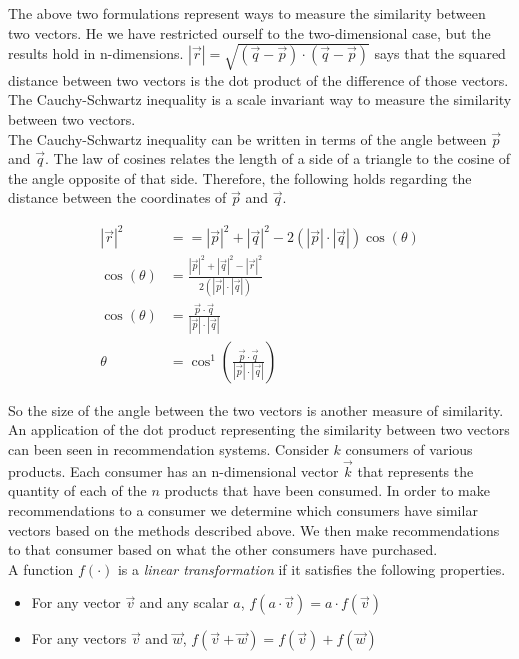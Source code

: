 \documentclass[12pt]{article}
\begin{document}
The above two formulations represent ways to measure the similarity between two vectors. He we have restricted ourself to the two-dimensional case, but the results hold in n-dimensions. $|\vec{r}| = \sqrt{(\vec{q}-\vec{p})\cdot(\vec{q}-\vec{p})}$ says that the squared distance between two vectors is the dot product of the difference of those vectors. The Cauchy-Schwartz inequality is a scale invariant way to measure the similarity between two vectors.\\

The Cauchy-Schwartz inequality can be written in terms of the angle between $\vec{p}$ and $\vec{q}$. The law of cosines relates the length of a side of a triangle to the cosine of the angle opposite of that side. Therefore, the following holds regarding the distance between the coordinates of $\vec{p}$ and $\vec{q}$. 

\begin{align*}
|\vec{r}|^2 &= = |\vec{p}|^2 + |\vec{q}|^2 - 2(|\vec{p}|\cdot|\vec{q}|)\cos{(\theta)} \\
\cos{(\theta)} &= \frac{ |\vec{p}|^2 + |\vec{q}|^2 - |\vec{r}|^2 }{2(|\vec{p}|\cdot|\vec{q}|)} \\
\cos{(\theta)} &= \frac{\vec{p}\cdot\vec{q}}{|\vec{p}|\cdot|\vec{q}|} \\
\theta &= \cos^1\left(  \frac{\vec{p}\cdot\vec{q}}{|\vec{p}|\cdot|\vec{q}|} \right)
\end{align*}

So the size of the angle between the two vectors is another measure of similarity. \\

An application of the dot product representing the similarity between two vectors can been seen in recommendation systems. Consider $k$ consumers of various products. Each consumer has an n-dimensional vector $\vec{k}$ that represents the quantity of each of the $n$ products that have been consumed. In order to make recommendations to a consumer we determine which consumers have similar vectors based on the methods described above. We then make recommendations to that consumer based on what the other consumers have purchased. \\

A function $f(\cdot)$ is a \emph{linear transformation} if it satisfies the following properties.
\begin{itemize}
\item For any vector $\vec{v}$ and any scalar $a$, $f(a\cdot\vec{v})=a\cdot f(\vec{v})$ 
\item For any vectors $\vec{v}$ and $\vec{w}$, $f(\vec{v}+\vec{w}) = f(\vec{v})+f(\vec{w})$
\end{itemize}
\end{document}
